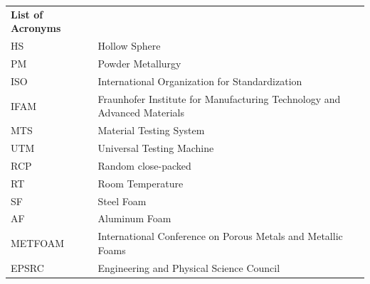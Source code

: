 \documentclass[review]{elsarticle}
\begin{document}
\begin{table}[htbp]
	\begin{tabular}{ll}
		\textbf{List of Acronyms} \\
		HS    & Hollow Sphere \\
		PM    & Powder Metallurgy \\
		ISO   & International Organization for Standardization \\
		IFAM  & Fraunhofer Institute for Manufacturing Technology and Advanced Materials \\
		MTS   & Material Testing System \\
		UTM   & Universal Testing Machine \\
		RCP   & Random close-packed \\
		RT    & Room Temperature \\
		SF    & Steel Foam \\
		AF    & Aluminum Foam \\
		METFOAM & International Conference on Porous Metals and Metallic Foams \\
		EPSRC & Engineering and Physical Science Council
	\end{tabular}%
\end{table}%

\FloatBarrier

\renewcommand{\nomname}{List of Symbols}





\end{document}
